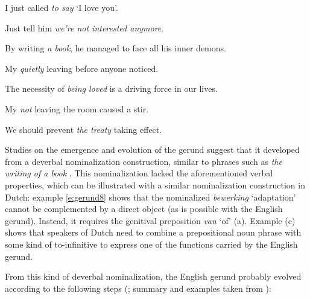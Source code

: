 \ea
\label{e:gerund1}
I just called \emph{to say} `I love you'.
\item Just tell him \emph{we're not interested anymore}.
\label{e:gerund2}
\item By writing \emph{a book}, he managed to face all his inner demons.
\label{e:gerund3}
\item My \emph{quietly} leaving before anyone noticed.
\label{e:gerund4}
\item The necessity of \emph{being loved} is a driving force in our lives.
\label{e:gerund5}
\item My \emph{not} leaving the room caused a stir.
\label{e:gerund6}
\item We should prevent \emph{the treaty} taking effect.
\label{e:gerund7}
\z

Studies on the emergence and evolution of the gerund suggest that it developed from a deverbal nominalization construction, similar to phrases such as \emph{the writing of a book} \citep{tajima85syntactic}. This nominalization lacked the aforementioned verbal properties, which can be illustrated with a similar nominalization construction in Dutch: example \ref{e:gerund8} shows that the nominalized \emph{bewerking} `adaptation' cannot be complemented by a direct object (as is possible with the English gerund). Instead, it requires the genitival preposition \emph{van} `of' (a). Example (c) shows that speakers of Dutch need to combine a prepositional noun phrase with some kind of  to-infinitive to express one of the functions carried by the English gerund.

\eal
\label{e:gerund8}
\zl

From this kind of deverbal nominalization, the English gerund probably evolved according to the following steps (\citealp{tajima85syntactic}; summary and examples taken from \citealp{fanego04reanalysis}):

